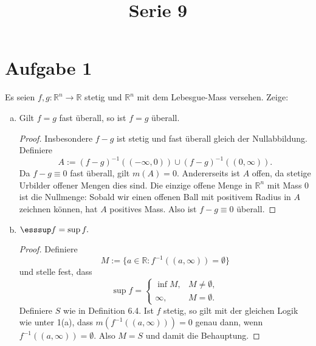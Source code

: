 \documentclass[10pt]{article}\usepackage[]{graphicx}\usepackage[]{color}
\title{Serie 9}
\date{}
\author{}
\newcommand{\R}{\mathbb{R}}
\begin{document}
\maketitle

\section*{Aufgabe 1}
Es seien $f, g: \R^n \to \R$ stetig und $\R^n$ mit dem Lebesgue-Mass
versehen. Zeige:
\begin{enumerate}[(a)]
  \item Gilt $f = g$ fast überall, so ist $f = g$ überall.
        
        \begin{proof}
        Insbesondere $f - g$ ist stetig und fast überall gleich
        der Nullabbildung. Definiere
        \[
          A := (f-g)^{-1}((-\infty, 0)) \cup (f-g)^{-1}((0, \infty)).
        \]
        Da $f - g \equiv 0$ fast überall, gilt $m(A) = 0$.
        Andererseits ist $A$ offen, da stetige Urbilder offener Mengen
        dies sind. Die einzige offene Menge in $\R^n$ mit Mass 0
        ist die Nullmenge: Sobald wir einen offenen Ball mit
        positivem Radius in $A$ zeichnen können, hat $A$ positives Mass.
        Also ist $f-g \equiv 0$ überall.
        \end{proof}
        
  \item $\esssup f = \sup f.$
        
        \begin{proof}
          Definiere
          \[
            M := \{a \in \R : f^{-1}((a, \infty)) = \emptyset \}
          \]
          und stelle fest, dass
          \[
            \sup f = 
            \begin{cases}
              \inf M, & M \neq \emptyset,\\
              \infty, & M = \emptyset.
            \end{cases}
          \]
          Definiere $S$ wie in Definition 6.4.
          Ist $f$ stetig, so gilt mit der gleichen Logik wie 
          unter 1(a), dass $m(f^{-1}((a, \infty))) = 0$
          genau dann, wenn $f^{-1}((a, \infty)) = \emptyset$.
          Also $M = S$ und damit die Behauptung.
        \end{proof}
\end{enumerate}
\end{document}
